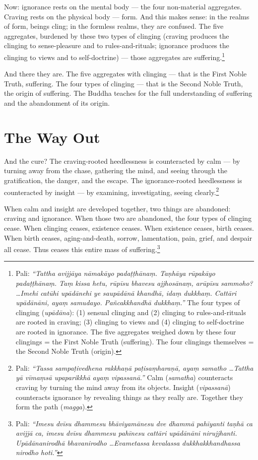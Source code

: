 Now: ignorance rests on the mental body --- the four non-material aggregates. Craving rests on the physical body --- form. And this makes sense: in the realms of form, beings cling; in the formless realms, they are confused. The five aggregates, burdened by these two types of clinging (craving produces the clinging to sense-pleasure and to rules-and-rituals; ignorance produces the clinging to views and to self-doctrine) --- those aggregates are suffering.\footnote{Pali: \textit{``Tattha avijjāya nāmakāyo padaṭṭhānaṃ. Taṇhāya rūpakāyo padaṭṭhānaṃ. Taṃ kissa hetu, rūpīsu bhavesu ajjhosānaṃ, arūpīsu sammoho? \ldots Imehi catūhi upādānehi ye saupādānā khandhā, idaṃ dukkhaṃ. Cattāri upādānāni, ayaṃ samudayo. Pañcakkhandhā dukkhaṃ.''} The four types of clinging (\textit{upādāna}): (1) sensual clinging and (2) clinging to rules-and-rituals are rooted in craving; (3) clinging to views and (4) clinging to self-doctrine are rooted in ignorance. The five aggregates weighed down by these four clingings = the First Noble Truth (suffering). The four clingings themselves = the Second Noble Truth (origin).}

And there they are. The five aggregates with clinging --- that is the First Noble Truth, suffering. The four types of clinging --- that is the Second Noble Truth, the origin of suffering. The Buddha teaches for the full understanding of suffering and the abandonment of its origin.

\section*{The Way Out}

And the cure? The craving-rooted heedlessness is counteracted by calm --- by turning away from the chase, gathering the mind, and seeing through the gratification, the danger, and the escape. The ignorance-rooted heedlessness is counteracted by insight --- by examining, investigating, seeing clearly.\footnote{Pali: \textit{``Tassa sampaṭivedhena rakkhaṇā paṭisaṃharaṇā, ayaṃ samatho \ldots Tattha yā vīmaṃsā upaparikkhā ayaṃ vipassanā.''} Calm (\textit{samatha}) counteracts craving by turning the mind away from its objects. Insight (\textit{vipassanā}) counteracts ignorance by revealing things as they really are. Together they form the path (\textit{magga}).}

When calm and insight are developed together, two things are abandoned: craving and ignorance. When those two are abandoned, the four types of clinging cease. When clinging ceases, existence ceases. When existence ceases, birth ceases. When birth ceases, aging-and-death, sorrow, lamentation, pain, grief, and despair all cease. Thus ceases this entire mass of suffering.\footnote{Pali: \textit{``Imesu dvīsu dhammesu bhāviyamānesu dve dhammā pahīyanti taṇhā ca avijjā ca, imesu dvīsu dhammesu pahīnesu cattāri upādānāni nirujjhanti. Upādānanirodhā bhavanirodho \ldots Evametassa kevalassa dukkhakkhandhassa nirodho hoti.''}}

